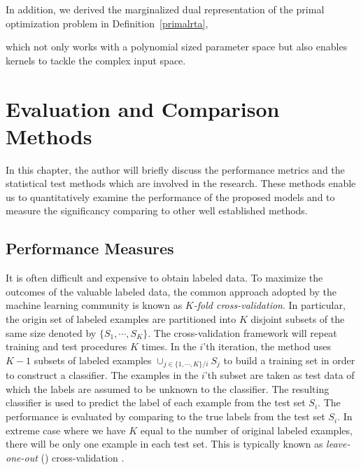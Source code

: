 {In addition, we derived the marginalized dual representation of the primal optimization problem in Definition~\ref{primalrta},

which not only works with a polynomial sized parameter space but also enables kernels to tackle the complex input space.



%
\iffalse
\chapter{Evaluation and Comparison Methods} \label{ch_ecm}

In this chapter, the author will briefly discuss the performance metrics and the statistical test methods which are involved in the research. 
These methods enable us to quantitatively examine the performance of the proposed models and to measure the significancy comparing to other well established methods.

%
\section{Performance Measures} \label{sc_pm}

It is often difficult and expensive to obtain labeled data. 
To maximize the outcomes of the valuable labeled data, the common approach adopted by the machine learning community is known as \textit{$K$-fold cross-validation}.
In particular, the origin set of labeled examples are partitioned into $K$ disjoint subsets of the same size denoted by $\{S_1,\cdots,S_K\}$.
The cross-validation framework will repeat training and test procedures $K$ times.
In the $i$'th iteration, the method uses $K-1$ subsets of labeled examples $\cup_{j\in\{1,\cdots,K\}/i}S_j$ to build a training set in order to construct a classifier.
The examples in the $i$'th subset are taken as test data of which the labels are assumed to be unknown to the classifier.
The resulting classifier is used to predict the label of each example from the test set $S_i$.
The performance is evaluated by comparing to the true labels from the test set $S_i$.
In extreme case where we have $K$ equal to the number of original labeled examples, there will be only one example in each test set.
This is typically known as \textit{leave-one-out} (\loo) {cross-validation} .

}
